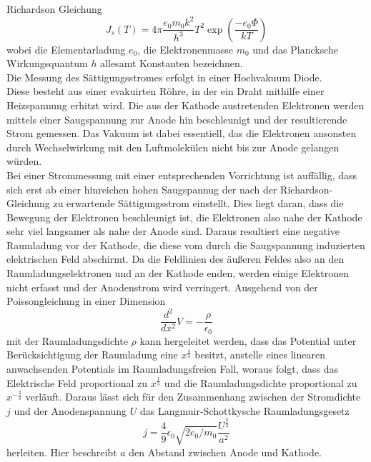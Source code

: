 Richardson Gleichung
\begin{equation}
    \label{eq:richardson}
J_s(T)=4\pi\frac{e_0m_0k^2}{h^3}T^2\exp(\frac{-e_0\Phi}{kT})
\end{equation}
wobei die Elementarladung $e_0$, die Elektronenmasse $m_0$ und das Plancksche Wirkungsquantum $h$ allesamt Konstanten bezeichnen. \\
Die Messung des Sättigungsstromes erfolgt in einer Hochvakuum Diode. \\ Diese besteht aus einer evakuirten Röhre, in der ein Draht mithilfe einer
Heizspannung erhitzt wird. Die aus der Kathode austretenden Elektronen werden mittels einer Saugspannung zur Anode hin beschleunigt
und der resultierende Strom gemessen. Das Vakuum ist dabei essentiell, das die Elektronen ansonsten durch Wechselwirkung mit den Luftmolekülen nicht 
bis zur Anode gelangen würden. \\
Bei einer Strommessung mit einer entsprechenden Vorrichtung ist auffällig, dass sich erst ab einer hinreichen hohen Saugspannug 
der nach der Richardson-Gleichung zu erwartende Sättigungsstrom einstellt. Dies liegt daran, dass die Bewegung der Elektronen beschleunigt ist,
die Elektronen also nahe der Kathode sehr viel langsamer als nahe der Anode sind. Daraus resultiert eine negative Raumladung vor der Kathode,
die diese vom durch die Saugspannung induzierten elektrischen Feld abschirmt. Da die Feldlinien des äußeren Feldes also an den Raumladungselektronen 
und an der Kathode enden, werden einige Elektronen nicht erfasst und der Anodenstrom wird verringert.
Ausgehend von der Poissongleichung in einer Dimension 
\begin{equation}
\frac{d^2}{dx^2}V=-\frac{\rho}{\epsilon_0}
\end{equation}
mit der Raumladungsdichte $\rho$ kann hergeleitet werden, dass das Potential unter Berücksichtigung der Raumladung eine $x^{\frac{4}{3}}$ besitzt, 
anstelle eines linearen anwachsenden Potentials im Raumladungsfreien Fall, woraus folgt, dass das Elektrische Feld proportional zu $x^{\frac{1}{3}}$
und die Raumladungsdichte proportional zu $x^{-\frac{2}{3}}$ verläuft. Daraus lässt sich für den Zusammenhang zwischen der Stromdichte $j$ 
und der Anodenspannung $U$ das Langmuir-Schottkysche Raumladungsgesetz 
\begin{equation}
j=\frac{4}{9}\epsilon_0\sqrt{2e_0/m_0}\frac{U^{\frac{3}{2}}}{a^2}
\end{equation}
herleiten. Hier beschreibt $a$ den Abstand zwischen Anode und Kathode. \\
